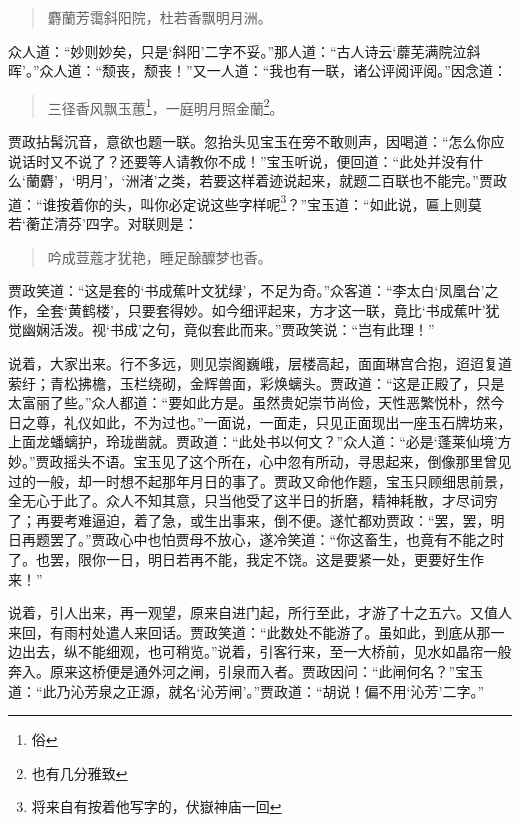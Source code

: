 \documentclass[12pt,oneside]{book}
\newenvironment{shici}{%
\begin{verse}%
\centering\large\hspace{12pt}}%
{\end{verse}}
\begin{document}
\begin{shici}
麝蘭芳霭斜阳院，杜若香飘明月洲。
\end{shici}


众人道：“妙则妙矣，只是‘斜阳’二字不妥。”那人道：“古人诗云‘蘼芜满院泣斜晖’。”众人道：“颓丧，颓丧！”又一人道：“我也有一联，诸公评阅评阅。”因念道：

\begin{shici}
三径香风飘玉蕙\footnote{俗}，一庭明月照金蘭\footnote{也有几分雅致}。
\end{shici}

贾政拈髯沉音，意欲也题一联。忽抬头见宝玉在旁不敢则声，因喝道：“怎么你应说话时又不说了？还要等人请教你不成！”宝玉听说，便回道：“此处并没有什么‘蘭麝’，‘明月’，‘洲渚’之类，若要这样着迹说起来，就题二百联也不能完。”贾政道：“谁按着你的头，叫你必定说这些字样呢\footnote{将来自有按着他写字的，伏嶽神庙一回}？”宝玉道：“如此说，匾上则莫若‘蘅芷清芬’四字。对联则是：

\begin{shici}
吟成荳蔻才犹艳，睡足酴醾梦也香。
\end{shici}

贾政笑道：“这是套的‘书成蕉叶文犹绿’，不足为奇。”众客道：“李太白‘凤凰台’之作，全套‘黄鹤楼’，只要套得妙。如今细评起来，方才这一联，竟比‘书成蕉叶’犹觉幽娴活泼。视‘书成’之句，竟似套此而来。”贾政笑说：“岂有此理！”

说着，大家出来。行不多远，则见崇阁巍峨，层楼高起，面面琳宫合抱，迢迢复道萦纡；青松拂檐，玉栏绕砌，金辉兽面，彩焕螭头。贾政道：“这是正殿了，只是太富丽了些。”众人都道：“要如此方是。虽然贵妃崇节尚俭，天性恶繁悦朴，然今日之尊，礼仪如此，不为过也。”一面说，一面走，只见正面现出一座玉石牌坊来，上面龙蟠螭护，玲珑凿就。贾政道：“此处书以何文？”众人道：“必是‘蓬莱仙境’方妙。”贾政摇头不语。宝玉见了这个所在，心中忽有所动，寻思起来，倒像那里曾见过的一般，却一时想不起那年月日的事了。贾政又命他作题，宝玉只顾细思前景，全无心于此了。众人不知其意，只当他受了这半日的折磨，精神耗散，才尽词穷了；再要考难逼迫，着了急，或生出事来，倒不便。遂忙都劝贾政：“罢，罢，明日再题罢了。”贾政心中也怕贾母不放心，遂冷笑道：“你这畜生，也竟有不能之时了。也罢，限你一日，明日若再不能，我定不饶。这是要紧一处，更要好生作来！”

说着，引人出来，再一观望，原来自进门起，所行至此，才游了十之五六。又值人来回，有雨村处遣人来回话。贾政笑道：“此数处不能游了。虽如此，到底从那一边出去，纵不能细观，也可稍览。”说着，引客行来，至一大桥前，见水如晶帘一般奔入。原来这桥便是通外河之闸，引泉而入者。贾政因问：“此闸何名？”宝玉道：“此乃沁芳泉之正源，就名‘沁芳闸’。”贾政道：“胡说！偏不用‘沁芳’二字。”
\end{document}
